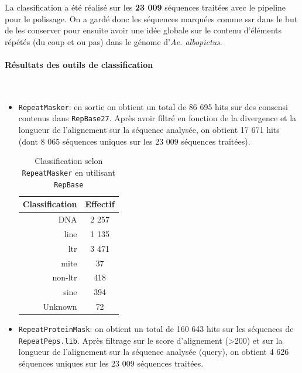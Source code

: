 \documentclass[10pt]{article}
\begin{document}
La classification a été réalisé sur les \textbf{23 009} séquences traitées avec le pipeline pour le polissage. On a gardé donc les séquences marquées comme \acrshort{ssr} dans le but de les conserver pour ensuite avoir une idée globale sur le contenu d'éléments répétés (du coup \acrlong{et} ou pas) dans le génome d'\textit{Ae. albopictus}.

\bigskip

\paragraph{Résultats des outils de classification} \textit{ } \\

\bigskip

\begin{itemize}
    \item[\ding{42}] \texttt{RepeatMasker}: en sortie on obtient un total de 86 695 hits sur des consensi contenus dans \texttt{RepBase27}. Après avoir filtré en fonction de la divergence et la longueur de l'alignement sur la séquence analysée, on obtient 17 671 hits (dont 8 065 séquences uniques sur les 23 009 séquences traitées). \\
    \begin{table}[H]
        \centering
        \begin{tabular}{r|c}
            \toprule
            \textbf{Classification} & \textbf{Effectif} \\
            \midrule
            \rowcolor{gray!10}
            DNA & 2 257 \\
            \acrshort{line} & 1 135 \\
            \rowcolor{gray!10}
            \acrshort{ltr} & 3 471 \\
            \acrshort{mite} & 37 \\
            \rowcolor{gray!10}
            non-\acrshort{ltr} & 418 \\
            \acrshort{sine} &  394 \\
            \rowcolor{gray!10}
            Unknown & 72 \\
            \bottomrule
        \end{tabular}
        \caption{Classification selon \texttt{RepeatMasker} en utilisant \texttt{RepBase}}
        \label{tab:repdfam_results}
    \end{table}
    \item[\ding{42}] \texttt{RepeatProteinMask}: on obtient un total de 160 643 hits sur les séquences de \texttt{RepeatPeps.lib}. Après filtrage sur le score d'alignement (>200) et sur la longueur de l'alignement sur la séquence analysée (query), on obtient 4 626 séquences uniques sur les 23 009 séquences traitées. \\
    

\end{itemize}
\end{document}
